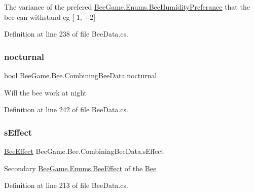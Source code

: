 The variance of the prefered \hyperlink{namespace_bee_game_1_1_enums_a66566cbc9da8d1d1e402156b4bd3bf9d}{Bee\+Game.\+Enums.\+Bee\+Humidity\+Preferance} that the bee can withstand eg \mbox{[}-\/1, +2\mbox{]} 



Definition at line 238 of file Bee\+Data.\+cs.

\mbox{\label{struct_bee_game_1_1_bee_1_1_combining_bee_data_a337800df462a764c58328d21d2398d6c}} 
\subsubsection{\texorpdfstring{nocturnal}{nocturnal}}
{\footnotesize\ttfamily bool Bee\+Game.\+Bee.\+Combining\+Bee\+Data.\+nocturnal}



Will the bee work at night 



Definition at line 242 of file Bee\+Data.\+cs.

\mbox{\label{struct_bee_game_1_1_bee_1_1_combining_bee_data_a6706a04242c477e5934d779fde7e7b8e}} 
\subsubsection{\texorpdfstring{s\+Effect}{sEffect}}
{\footnotesize\ttfamily \hyperlink{namespace_bee_game_1_1_enums_acf7ae32a86385a40fc0c7b55af95c6c3}{Bee\+Effect} Bee\+Game.\+Bee.\+Combining\+Bee\+Data.\+s\+Effect}



Secondary \hyperlink{namespace_bee_game_1_1_enums_acf7ae32a86385a40fc0c7b55af95c6c3}{Bee\+Game.\+Enums.\+Bee\+Effect} of the \hyperlink{namespace_bee_game_1_1_bee}{Bee} 



Definition at line 213 of file Bee\+Data.\+cs.

